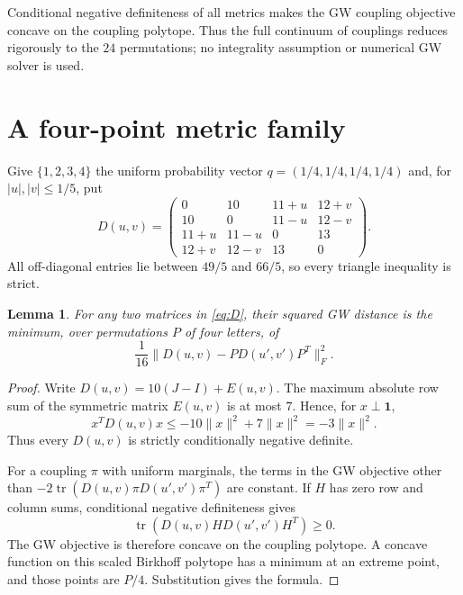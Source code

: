 \documentclass[11pt]{article}
\newtheorem{lemma}[theorem]{Lemma}
\newcommand{\one}{\mathbf 1}
\begin{document}
Conditional negative definiteness of all metrics makes the GW coupling
objective concave on the coupling polytope. Thus the full continuum of
couplings reduces rigorously to the $24$ permutations; no integrality
assumption or numerical GW solver is used.

\section{A four-point metric family}

Give $\{1,2,3,4\}$ the uniform probability vector
$q=(1/4,1/4,1/4,1/4)$ and, for $|u|,|v|\leq1/5$, put
\begin{equation}\label{eq:D}
D(u,v)=
\begin{pmatrix}
0&10&11+u&12+v\\
10&0&11-u&12-v\\
11+u&11-u&0&13\\
12+v&12-v&13&0
\end{pmatrix}.
\end{equation}
All off-diagonal entries lie between $49/5$ and $66/5$, so every triangle
inequality is strict.

\begin{lemma}\label{lem:permutations}
For any two matrices in \eqref{eq:D}, their squared GW distance is the
minimum, over permutations $P$ of four letters, of
\[
  \frac1{16}\|D(u,v)-P D(u',v')P^T\|_F^2.
\]
\end{lemma}

\begin{proof}
Write $D(u,v)=10(J-I)+E(u,v)$. The maximum absolute row sum of the symmetric
matrix $E(u,v)$ is at most $7$. Hence, for $x\perp\one$,
\[
 x^TD(u,v)x\leq -10\|x\|^2+7\|x\|^2=-3\|x\|^2.
\]
Thus every $D(u,v)$ is strictly conditionally negative definite.

For a coupling $\pi$ with uniform marginals, the terms in the GW objective
other than
$-2\operatorname{tr}(D(u,v)\pi D(u',v')\pi^T)$ are constant. If $H$ has
zero row and column sums, conditional negative definiteness gives
\[
 \operatorname{tr}(D(u,v)H D(u',v')H^T)\geq0.
\]
The GW objective is therefore concave on the coupling polytope. A concave
function on this scaled Birkhoff polytope has a minimum at an extreme point,
and those points are $P/4$. Substitution gives the formula.
\end{proof}
\end{document}

